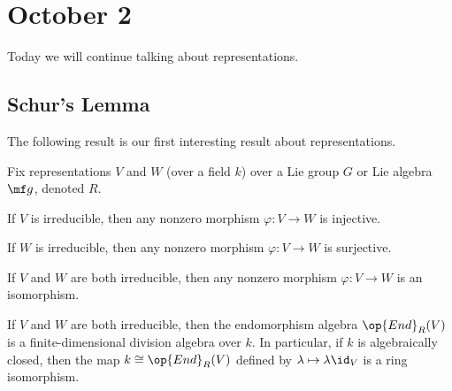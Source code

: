 \documentclass[../notes.tex]{subfiles}
\begin{document}
\section{October 2}
Today we will continue talking about representations.

\subsection{Schur's Lemma}
The following result is our first interesting result about representations.
\begin{proposition} \label{prop:schur-lemma}
	Fix representations $V$ and $W$ (over a field $k$) over a Lie group $G$ or Lie algebra $\mf g$, denoted $R$.
	\begin{listalph}
		\item If $V$ is irreducible, then any nonzero morphism $\varphi\colon V\to W$ is injective.
		\item If $W$ is irreducible, then any nonzero morphism $\varphi\colon V\to W$ is surjective.
		\item If $V$ and $W$ are both irreducible, then any nonzero morphism $\varphi\colon V\to W$ is an isomorphism.
		\item If $V$ and $W$ are both irreducible, then the endomorphism algebra $\op{End}_R(V)$ is a finite-dimensional division algebra over $k$. In particular, if $k$ is algebraically closed, then the map $k\cong\op{End}_R(V)$ defined by $\lambda\mapsto\lambda\id_V$ is a ring isomorphism.
	\end{listalph}
\end{proposition}
\end{document}
